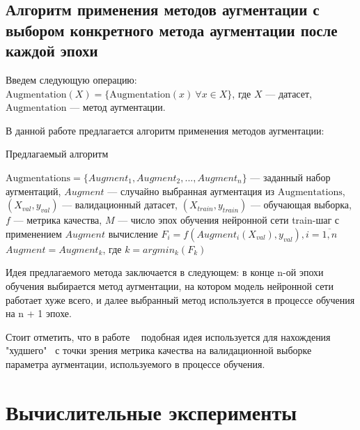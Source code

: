 \documentclass[12pt, fleqn]{article}
\begin{document}
\subsection{Алгоритм применения методов аугментации с выбором конкретного метода аугментации после каждой эпохи}

Введем следующую операцию: \newline
$\text{Augmentation}(X) = \{\text{Augmentation}(x) \ \forall x \in X\}$, где $X$ --- датасет, \newline $\text{Augmentation}$ --- метод аугментации.

В данной работе предлагается алгоритм применения методов аугментации:

\algrenewcommand{}
\algrenewcommand{}

\begin{algorithm}
\caption{Предлагаемый алгоритм}\label{alg:Alg1}
\begin{algorithmic}
\State $\text{Augmentations} = \{Augment_1, Augment_2, ..., Augment_n\}$ --- заданный набор аугментаций,
\State $Augment$ --- случайно выбранная аугментация  из $\text{Augmentations}$,
\State $(X_{val}, y_{val})$ --- валидационный датасет, 
\State $(X_{train}, y_{train})$ --- обучающая выборка,
\State $f$ --- метрика качества,
\State $M$ --- число эпох обучения нейронной сети
\State train-шаг с применением $Augment$
\State вычисление $F_i = f(Augment_i(X_{val}), y_{val}), i = \overline{1,n}$
\State $Augment = Augment_k$, где $k = argmin_k(F_k)$
\EndFor
\end{algorithmic}
\end{algorithm}

Идея предлагаемого метода заключается в следующем: в конце n-ой эпохи обучения выбирается метод аугментации, на котором модель нейронной сети работает хуже всего, и далее выбранный метод используется в процессе обучения на n + 1 эпохе.

Стоит отметить, что в работе ~\cite{NearestAlgorithm} подобная идея используется для нахождения "худшего" \ с точки зрения метрика качества на валидационной выборке параметра аугментации, используемого в процессе обучения. 

\section{Вычислительные эксперименты}
	
\end{document}

